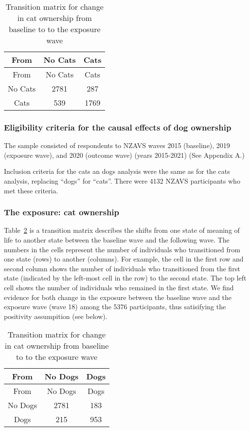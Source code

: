 \documentclass[
  singlecolumn,
  9pt]{article}
\begin{document}
\begin{longtable}[]{@{}ccc@{}}
\caption{Transition matrix for change in cat ownership from baseline to
to the exposure wave}\label{tbl-transition}\tabularnewline
\toprule\noalign{}
From & No Cats & Cats \\
\midrule\noalign{}
\endfirsthead
\toprule\noalign{}
From & No Cats & Cats \\
\midrule\noalign{}
\endhead
\bottomrule\noalign{}
\endlastfoot
No Cats & 2781 & 287 \\
Cats & 539 & 1769 \\
\end{longtable}

\subsubsection{Eligibility criteria for the causal effects of dog
ownership}\label{eligibility-criteria-for-the-causal-effects-of-dog-ownership}

The sample consisted of respondents to NZAVS waves 2015 (baseline), 2019
(exposure wave), and 2020 (outcome wave) (years 2015-2021) (See Appendix
A.)

Inclusion criteria for the cats an dogs analysis were the same as for
the cats analysis, replacing ``dogs'' for ``cats''. There were 4132
NZAVS participants who met these criteria.

\subsubsection{The exposure: cat
ownership}\label{the-exposure-cat-ownership-1}

Table~\ref{tbl-transition-dogs} is a transition matrix describes the
shifts from one state of meaning of life to another state between the
baseline wave and the following wave. The numbers in the cells represent
the number of individuals who transitioned from one state (rows) to
another (columns). For example, the cell in the first row and second
column shows the number of individuals who transitioned from the first
state (indicated by the left-most cell in the row) to the second state.
The top left cell shows the number of individuals who remained in the
first state. We find evidence for both change in the exposure between
the baseline wave and the exposure wave (wave 18) among the 5376
participants, thus satisifying the positivity assumpition (see below).

\begin{longtable}[]{@{}ccc@{}}
\caption{Transition matrix for change in cat ownership from baseline to
to the exposure wave}\label{tbl-transition-dogs}\tabularnewline
\toprule\noalign{}
From & No Dogs & Dogs \\
\midrule\noalign{}
\endfirsthead
\toprule\noalign{}
From & No Dogs & Dogs \\
\midrule\noalign{}
\endhead
\bottomrule\noalign{}
\endlastfoot
No Dogs & 2781 & 183 \\
Dogs & 215 & 953 \\
\end{longtable}
\end{document}
